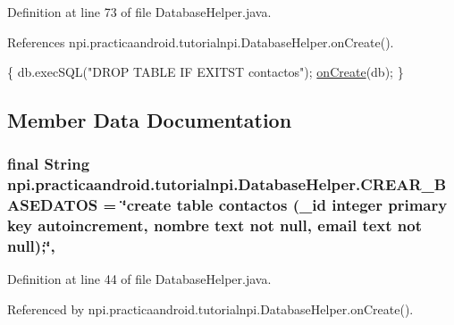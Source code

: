 Definition at line 73 of file Database\-Helper.\-java.



References npi.\-practicaandroid.\-tutorialnpi.\-Database\-Helper.\-on\-Create().


\begin{DoxyCode}
                                                                             \{
        db.execSQL(\textcolor{stringliteral}{"DROP TABLE IF EXITST contactos"});
        \hyperlink{classnpi_1_1practicaandroid_1_1tutorialnpi_1_1_database_helper_abc388b15e9868b07fc01d4b271af1634}{onCreate}(db);
    \}
\end{DoxyCode}


\subsection{Member Data Documentation}
\hypertarget{classnpi_1_1practicaandroid_1_1tutorialnpi_1_1_database_helper_a943030e82324d9b39e297dee68ec917e}{
\subsubsection[{C\-R\-E\-A\-R\-\_\-\-B\-A\-S\-E\-D\-A\-T\-O\-S}]{\setlength{\rightskip}{0pt plus 5cm}final String npi.\-practicaandroid.\-tutorialnpi.\-Database\-Helper.\-C\-R\-E\-A\-R\-\_\-\-B\-A\-S\-E\-D\-A\-T\-O\-S = \char`\"{}create table contactos (\-\_\-id integer primary key autoincrement, nombre text not null, email text not null);\char`\"{}\hspace{0.3cm}{\ttfamily [static]}, {\ttfamily [private]}}}\label{classnpi_1_1practicaandroid_1_1tutorialnpi_1_1_database_helper_a943030e82324d9b39e297dee68ec917e}


Definition at line 44 of file Database\-Helper.\-java.



Referenced by npi.\-practicaandroid.\-tutorialnpi.\-Database\-Helper.\-on\-Create().

